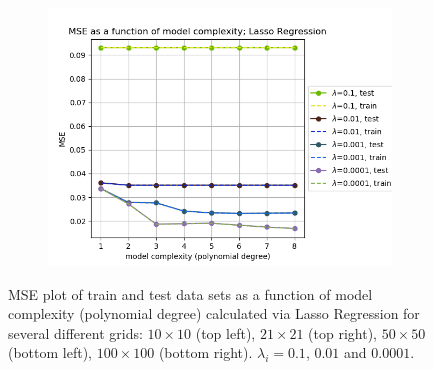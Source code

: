 \begin{figure}[!htbp]
\begin{subfigure}{\textwidth}
\end{subfigure}
\begin{subfigure}{\textwidth}
  \centering
  \includegraphics[width=0.55\linewidth]{images/mse/fake_lasso_mse_p08_n100.png}
\end{subfigure}
\caption{MSE plot of train and test data sets as a function of model complexity (polynomial degree) calculated via Lasso Regression for several different grids: $10\times10$ (top left), $21\times21$ (top right), $50\times50$ (bottom left), $100\times100$ (bottom right). $\lambda_i = 0.1$, $0.01$ and $0.0001$.}
\label{fig:lasso-mse}
\end{figure}


